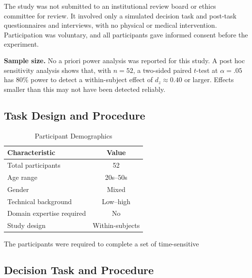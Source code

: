 \documentclass[journal]{IEEEtran}
\theoremstyle{plain}
\theoremstyle{definition}
\providecommand{\DIFaddtex}[1]{{\protect\color{blue} \sf #1}} %
\providecommand{\DIFdeltex}[1]{{\protect\color{red} \scriptsize #1}} %
\providecommand{\DIFaddbegin}{} %
\providecommand{\DIFaddend}{} %
\providecommand{\DIFdelbegin}{} %
\providecommand{\DIFdelend}{} %
\providecommand{\DIFadd}[1]{\texorpdfstring{\DIFaddtex{#1}}{#1}} %
\providecommand{\DIFdel}[1]{\texorpdfstring{\DIFdeltex{#1}}{}} %
\newcommand{\DIFscaledelfig}{0.5}
\newlength{\DIFdelgraphicswidth} %
\newlength{\DIFdelgraphicsheight} %
\newcommand{\DIFaddincludegraphics}[2][]{{\color{blue}\fbox{\DIFOincludegraphics[#1]{#2}}}} %
\newcommand{\DIFdelincludegraphics}[2][]{%
\sbox{\DIFdelgraphicsbox}{\DIFOincludegraphics[#1]{#2}}%
\settoboxwidth{\DIFdelgraphicswidth}{\DIFdelgraphicsbox} %
\settoboxtotalheight{\DIFdelgraphicsheight}{\DIFdelgraphicsbox} %
\scalebox{\DIFscaledelfig}{%
\parbox[b]{\DIFdelgraphicswidth}{\usebox{\DIFdelgraphicsbox}\\[-\baselineskip] \rule{\DIFdelgraphicswidth}{0em}}\llap{\resizebox{\DIFdelgraphicswidth}{\DIFdelgraphicsheight}{%
\setlength{\unitlength}{\DIFdelgraphicswidth}%
\begin{picture}(1,1)%
\thicklines\linethickness{2pt} %
{\color[rgb]{1,0,0}\put(0,0){\framebox(1,1){}}}%
{\color[rgb]{1,0,0}\put(0,0){\line( 1,1){1}}}%
{\color[rgb]{1,0,0}\put(0,1){\line(1,-1){1}}}%
\end{picture}%
}\hspace*{3pt}}} %
} %
\DeclareRobustCommand{\DIFaddbegin}{\DIFOaddbegin \let\includegraphics\DIFaddincludegraphics} %
\DeclareRobustCommand{\DIFaddend}{\DIFOaddend \let\includegraphics\DIFOincludegraphics} %
\DeclareRobustCommand{\DIFdelbegin}{\DIFOdelbegin \let\includegraphics\DIFdelincludegraphics} %
\DeclareRobustCommand{\DIFdelend}{\DIFOaddend \let\includegraphics\DIFOincludegraphics} %
\begin{document}
    \DIFadd{The study was not submitted to an institutional review board or ethics committee for review. It involved only a simulated decision task and post-task questionnaires and interviews, with no physical or medical intervention. Participation was voluntary, and all participants gave informed consent before the experiment.
}

    \DIFadd{\textbf{Sample size.} No a priori power analysis was reported for this study. A post hoc sensitivity analysis shows that, with $n=52$, a two-sided paired $t$-test at $\alpha=.05$ has 80\% power to detect a within-subject effect of $d_z \approx 0.40$ or larger. Effects smaller than this may not have been detected reliably}\DIFaddend .

    \DIFdelbegin \subsection{\DIFdel{Task Design and Procedure}}
\addtocounter{subsection}{-1}%
\DIFdelend \DIFaddbegin \begin{table}[t]
        \caption{Participant Demographics}
        \label{tab:participants}
        \centering
        \begin{tabular}{l c}
            \toprule
            Characteristic & Value \\
            \midrule
            Total participants & 52 \\
            Age range & 20s--50s \\
            Gender & Mixed \\
            Technical background & Low--high \\
            Domain expertise required & No \\
            Study design & Within-subjects \\
            \bottomrule
        \end{tabular}
    \end{table}
\DIFaddend 

    \DIFdelbegin \DIFdel{The participants were required to complete a set of time-sensitive }\DIFdelend \DIFaddbegin \subsection{\DIFadd{Decision Task and Procedure}}
\end{document}
